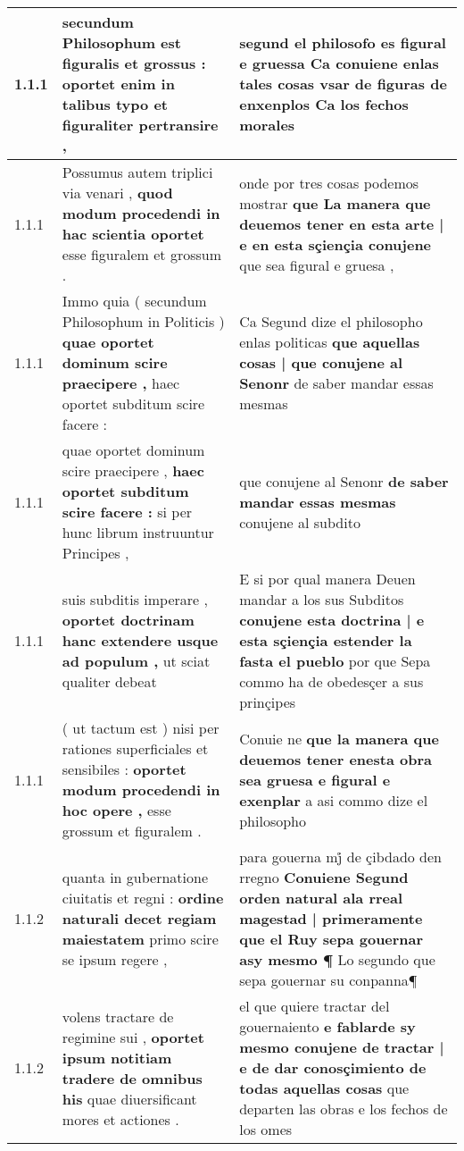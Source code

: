 \begin{tabular}{|p{1cm}|p{6.5cm}|p{6.5cm}|}

\hline
1.1.1 & secundum Philosophum est figuralis et grossus : \textbf{ oportet enim in talibus typo } et figuraliter pertransire , & segund el philosofo es figural e gruessa \textbf{ Ca conuiene enlas tales cosas vsar de figuras de enxenplos } Ca los fechos morales \\\hline
1.1.1 & Possumus autem triplici via venari , \textbf{ quod modum procedendi in hac scientia oportet } esse figuralem et grossum . & onde por tres cosas podemos mostrar \textbf{ que La manera que deuemos tener en esta arte | e en esta sçiençia conujene } que sea figural e gruesa , \\\hline
1.1.1 & Immo quia ( secundum Philosophum in Politicis ) \textbf{ quae oportet dominum scire praecipere , } haec oportet subditum scire facere : & Ca Segund dize el philosopho enlas politicas \textbf{ que aquellas cosas | que conujene al Senonr } de saber mandar essas mesmas \\\hline
1.1.1 & quae oportet dominum scire praecipere , \textbf{ haec oportet subditum scire facere : } si per hunc librum instruuntur Principes , & que conujene al Senonr \textbf{ de saber mandar essas mesmas } conujene al subdito \\\hline
1.1.1 & suis subditis imperare , \textbf{ oportet doctrinam hanc extendere usque ad populum , } ut sciat qualiter debeat & E si por qual manera Deuen mandar a los sus Subditos \textbf{ conujene esta doctrina | e esta sçiençia estender la fasta el pueblo } por que Sepa commo ha de obedesçer a sus prinçipes \\\hline
1.1.1 & ( ut tactum est ) nisi per rationes superficiales et sensibiles : \textbf{ oportet modum procedendi in hoc opere , } esse grossum et figuralem . & Conuie ne \textbf{ que la manera que deuemos tener enesta obra sea gruesa e figural e exenplar } a asi commo dize el philosopho \\\hline
1.1.2 & quanta in gubernatione ciuitatis et regni : \textbf{ ordine naturali decet regiam maiestatem } primo scire se ipsum regere , & para gouerna mj̊ de çibdado den rregno \textbf{ Conuiene Segund orden natural ala rreal magestad | primeramente que el Ruy sepa gouernar asy mesmo ¶ } Lo segundo que sepa gouernar su conpanna¶ \\\hline
1.1.2 & volens tractare de regimine sui , \textbf{ oportet ipsum notitiam tradere de omnibus his } quae diuersificant mores et actiones . & el que quiere tractar del gouernaiento \textbf{ e fablarde sy mesmo conujene de tractar | e de dar conosçimiento de todas aquellas cosas } que departen las obras e los fechos de los omes \\\hline

\end{tabular}
